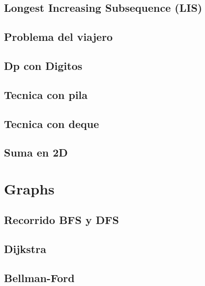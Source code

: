 \subsection{Longest Increasing Subsequence (LIS)}
\raggedbottom
\hrulefill
\subsection{Problema del viajero}
\raggedbottom
\hrulefill
\subsection{Dp con Digitos}
\raggedbottom
\hrulefill
\subsection{Tecnica con pila}
\raggedbottom
\hrulefill
\subsection{Tecnica con deque}
\raggedbottom
\hrulefill
\subsection{Suma en 2D}
\raggedbottom
\hrulefill
\newpage

\section{Graphs}
\subsection{Recorrido BFS y DFS}
\raggedbottom
\hrulefill
\subsection{Dijkstra}
\raggedbottom
\hrulefill
\subsection{Bellman-Ford}
\raggedbottom
\hrulefill
